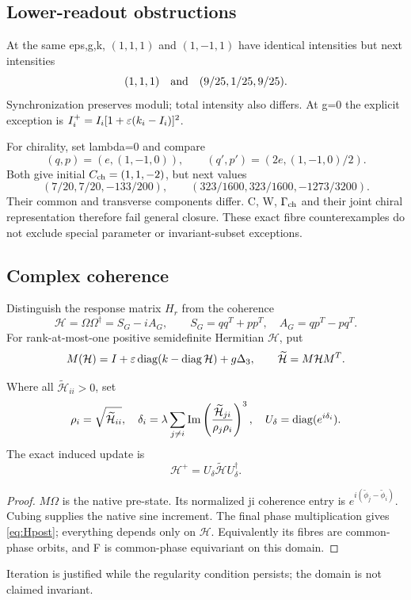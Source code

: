 \subsection{Lower-readout obstructions}
At the same eps,g,k, \((1,1,1)\) and \((1,-1,1)\) have identical intensities but next intensities
\[
(1,1,1)\quad\hbox{and}\quad(9/25,1/25,9/25).
\]
Synchronization preserves moduli; total intensity also differs. At g=0 the explicit exception is \(I_i^+=I_i[1+\varepsilon(k_i-I_i)]^2\).

For chirality, set lambda=0 and compare
\[
(q,p)=(e,(1,-1,0)),\qquad(q',p')=(2e,(1,-1,0)/2).
\]
Both give initial \(C_{\rm ch}=(1,1,-2)\), but next values
\[
(7/20,7/20,-133/200),\qquad
(323/1600,323/1600,-1273/3200).
\]
Their common and transverse components differ. C, W, \(\Gamma_{\rm ch}\) and their joint chiral representation therefore fail general closure. These exact fibre counterexamples do not exclude special parameter or invariant-subset exceptions.

\subsection{Complex coherence}
Distinguish the response matrix \(H_r\) from the coherence
\[
\mathcal H=\Omega\Omega^\dagger=S_G-iA_G,\qquad
S_G=qq^T+pp^T,\quad A_G=qp^T-pq^T .
\]
For rank-at-most-one positive semidefinite Hermitian \(\mathcal H\), put
\begin{equation}
M(\mathcal H)=I+\varepsilon\operatorname{diag}(k-\operatorname{diag}\mathcal H)+g\Delta_3,\qquad
\widetilde{\mathcal H}=M\mathcal HM^T.\label{eq:Hpre}
\end{equation}
\begin{theorem}\label{thm:Hclosure}
Where all \(\widetilde{\mathcal H}_{ii}>0\), set
\[
\rho_i=\sqrt{\widetilde{\mathcal H}_{ii}},\quad
\delta_i=\lambda\sum_{j\ne i}\operatorname{Im}
\left(\frac{\widetilde{\mathcal H}_{ji}}{\rho_j\rho_i}\right)^3,\quad
U_\delta=\operatorname{diag}(e^{i\delta_i}).
\]
The exact induced update is
\begin{equation}
\boxed{\mathcal H^+=U_\delta\widetilde{\mathcal H}U_\delta^\dagger.}\label{eq:Hpost}
\end{equation}
\end{theorem}
\begin{proof}
\(M\Omega\) is the native pre-state. Its normalized ji coherence entry is \(e^{i(\widetilde\phi_j-\widetilde\phi_i)}\). Cubing supplies the native sine increment. The final phase multiplication gives \eqref{eq:Hpost}; everything depends only on \(\mathcal H\). Equivalently its fibres are common-phase orbits, and F is common-phase equivariant on this domain.
\end{proof}
Iteration is justified while the regularity condition persists; the domain is not claimed invariant.


